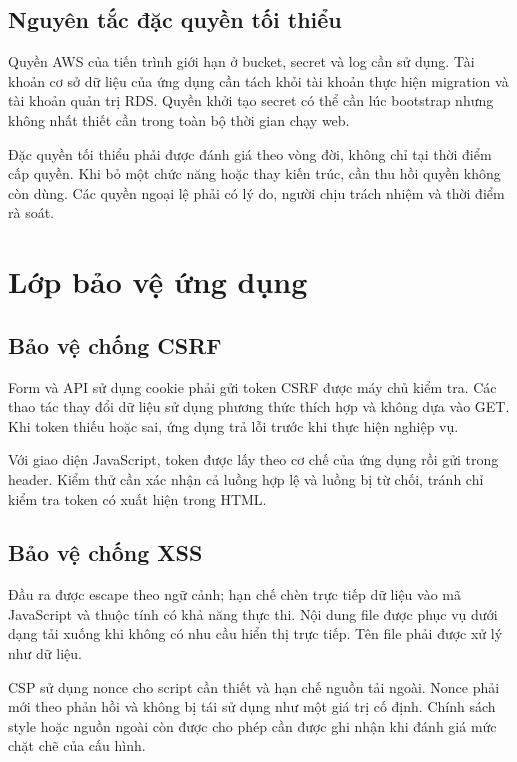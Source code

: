 \subsection{Nguyên tắc đặc quyền tối thiểu}
Quyền AWS của tiến trình giới hạn ở bucket, secret và log cần sử dụng. Tài khoản cơ sở dữ liệu của ứng dụng cần tách khỏi tài khoản thực hiện migration và tài khoản quản trị RDS. Quyền khởi tạo secret có thể cần lúc bootstrap nhưng không nhất thiết cần trong toàn bộ thời gian chạy web.

Đặc quyền tối thiểu phải được đánh giá theo vòng đời, không chỉ tại thời điểm cấp quyền. Khi bỏ một chức năng hoặc thay kiến trúc, cần thu hồi quyền không còn dùng. Các quyền ngoại lệ phải có lý do, người chịu trách nhiệm và thời điểm rà soát.

\section{Lớp bảo vệ ứng dụng}
\subsection{Bảo vệ chống CSRF}
Form và API sử dụng cookie phải gửi token CSRF được máy chủ kiểm tra. Các thao tác thay đổi dữ liệu sử dụng phương thức thích hợp và không dựa vào GET. Khi token thiếu hoặc sai, ứng dụng trả lỗi trước khi thực hiện nghiệp vụ.

Với giao diện JavaScript, token được lấy theo cơ chế của ứng dụng rồi gửi trong header. Kiểm thử cần xác nhận cả luồng hợp lệ và luồng bị từ chối, tránh chỉ kiểm tra token có xuất hiện trong HTML.
\subsection{Bảo vệ chống XSS}
Đầu ra được escape theo ngữ cảnh; hạn chế chèn trực tiếp dữ liệu vào mã JavaScript và thuộc tính có khả năng thực thi. Nội dung file được phục vụ dưới dạng tải xuống khi không có nhu cầu hiển thị trực tiếp. Tên file phải được xử lý như dữ liệu.

CSP sử dụng nonce cho script cần thiết và hạn chế nguồn tải ngoài. Nonce phải mới theo phản hồi và không bị tái sử dụng như một giá trị cố định. Chính sách style hoặc nguồn ngoài còn được cho phép cần được ghi nhận khi đánh giá mức chặt chẽ của cấu hình.
